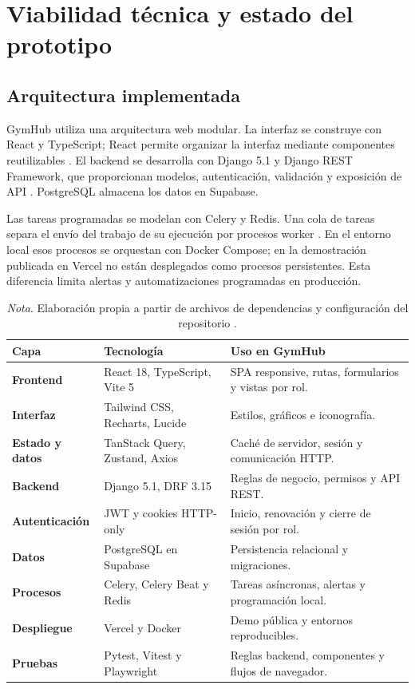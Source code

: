 \section{Viabilidad técnica y estado del prototipo}

\subsection{Arquitectura implementada}

GymHub utiliza una arquitectura web modular. La interfaz se construye con React
y TypeScript; React permite organizar la interfaz mediante componentes
reutilizables \parencite{react2026}. El backend se desarrolla con Django 5.1 y
Django REST Framework, que proporcionan modelos, autenticación, validación y
exposición de API \parencite{django51,drf315}. PostgreSQL almacena los datos en
Supabase.

Las tareas programadas se modelan con Celery y Redis. Una cola de tareas separa
el envío del trabajo de su ejecución por procesos worker
\parencite{celery2026}. En el entorno local esos procesos se orquestan con Docker
Compose; en la demostración publicada en Vercel no están desplegados como procesos
persistentes. Esta diferencia limita alertas y automatizaciones programadas en
producción.

\begin{table}[H]
\caption{Tecnologías verificadas en el repositorio}
\begin{tabularx}{\textwidth}{>{\bfseries}p{3cm}p{4cm}X}
\toprule
Capa & Tecnología & Uso en GymHub \\
\midrule
Frontend & React 18, TypeScript, Vite 5 & SPA responsive, rutas, formularios y vistas por rol. \\
Interfaz & Tailwind CSS, Recharts, Lucide & Estilos, gráficos e iconografía. \\
Estado y datos & TanStack Query, Zustand, Axios & Caché de servidor, sesión y comunicación HTTP. \\
Backend & Django 5.1, DRF 3.15 & Reglas de negocio, permisos y API REST. \\
Autenticación & JWT y cookies HTTP-only & Inicio, renovación y cierre de sesión por rol. \\
Datos & PostgreSQL en Supabase & Persistencia relacional y migraciones. \\
Procesos & Celery, Celery Beat y Redis & Tareas asíncronas, alertas y programación local. \\
Despliegue & Vercel y Docker & Demo pública y entornos reproducibles. \\
Pruebas & Pytest, Vitest y Playwright & Reglas backend, componentes y flujos de navegador. \\
\bottomrule
\end{tabularx}
\caption*{\textit{Nota}. Elaboración propia a partir de archivos de dependencias y configuración del repositorio \parencite{gymhub_repo}.}
\end{table}


